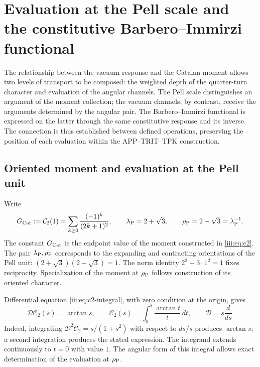 \section{Evaluation at the Pell scale and the constitutive Barbero--Immirzi functional}
\label{iii:sec:pell-barbero}

The relationship between the vacuum response and the Catalan moment allows
two levels of transport to be composed: the weighted depth of the
quarter-turn character and evaluation of the angular channels. The Pell scale
distinguishes an argument of the moment collection; the vacuum channels,
by contrast, receive the arguments determined by the angular pair.
The Barbero--Immirzi functional is expressed on the latter through
the same constitutive response and its inverse. The connection is thus established
between defined operations, preserving the position of each evaluation
within the APP--TRIT--TPK construction.

\subsection{Oriented moment and evaluation at the Pell unit}

Write
\begin{equation}
 G_{\rm Cat}:=\mathcal C_2(1)
 =\sum_{k\geq0}\frac{(-1)^k}{(2k+1)^2},\qquad
 \lambda_{\rm P}=2+\sqrt3,\qquad
 \rho_{\rm P}=2-\sqrt3=\lambda_{\rm P}^{-1}.
 \label{iii:eq:pell-scales}
\end{equation}
The constant $G_{\rm Cat}$ is the endpoint value of the moment constructed in
\eqref{iii:eq:c2}. The pair $\lambda_{\rm P},\rho_{\rm P}$ corresponds to
the expanding and contracting orientations of the Pell unit:
$(2+\sqrt3)(2-\sqrt3)=1$. The norm identity $2^2-3\cdot1^2=1$
fixes reciprocity. Specialization of the moment at $\rho_{\rm P}$
follows construction of its oriented character.

Differential equation \eqref{iii:eq:c2-integral}, with zero condition
at the origin, gives
\begin{equation}
 \mathcal D\mathcal C_2(s)=\arctan s,\qquad
 \mathcal C_2(s)=\int_0^s\frac{\arctan t}{t}\,dt,
 \qquad \mathcal D=s\frac{d}{ds}.
 \label{iii:eq:pell-moment-integral}
\end{equation}
Indeed, integrating $\mathcal D^2\mathcal C_2=s/(1+s^2)$ with respect to
$ds/s$ produces $\arctan s$; a second integration produces the stated
expression. The integrand extends continuously to $t=0$ with value $1$.
The angular form of this integral allows exact determination of the
evaluation at $\rho_{\rm P}$.

